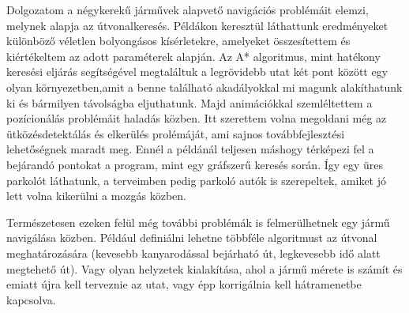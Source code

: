 
Dolgozatom a négykerekű járművek alapvető navigációs problémáit elemzi, melynek alapja az útvonalkeresés. Példákon keresztül láthattunk eredményeket különböző véletlen bolyongásos kísérletekre, amelyeket összesítettem és kiértékeltem az adott paraméterek alapján. Az A* algoritmus, mint hatékony keresési eljárás segítségével megtaláltuk a legrövidebb utat két pont között egy olyan környezetben,amit a benne található akadályokkal mi magunk alakíthatunk ki és bármilyen távolságba eljuthatunk. Majd animációkkal szemléltettem a pozícionálás problémáit haladás közben. Itt szerettem volna megoldani még az ütközésdetektálás és elkerülés prolémáját, ami sajnos továbbfejlesztési lehetőségnek maradt meg. Ennél a példánál teljesen máshogy térképezi fel a bejárandó pontokat a program, mint egy gráfszerű keresés során. Így egy üres parkolót láthatunk, a terveimben pedig parkoló autók is szerepeltek, amiket jó lett volna kikerülni a mozgás közben.

Természetesen ezeken felül még további problémák is felmerülhetnek egy jármű navigálása közben. Például definiálni lehetne többféle algoritmust az útvonal meghatározására (kevesebb kanyarodással bejárható út, legkevesebb idő alatt megtehető út). Vagy olyan helyzetek kialakítása, ahol a jármű mérete is számít és emiatt újra kell terveznie az utat, vagy épp korrigálnia kell hátramenetbe kapcsolva.